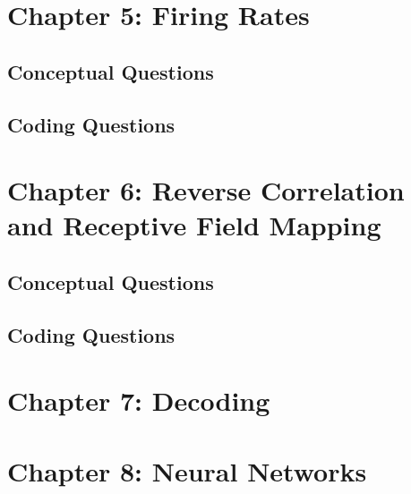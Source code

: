 \documentclass[
]{book}
\begin{document}
\hypertarget{chapter-5-firing-rates}{%
\section{Chapter 5: Firing Rates}\label{chapter-5-firing-rates}}

\hypertarget{conceptual-questions-2}{%
\subsection{Conceptual Questions}\label{conceptual-questions-2}}

\hypertarget{coding-questions-2}{%
\subsection{Coding Questions}\label{coding-questions-2}}

\hypertarget{chapter-6-reverse-correlation-and-receptive-field-mapping}{%
\section{Chapter 6: Reverse Correlation and Receptive Field Mapping}\label{chapter-6-reverse-correlation-and-receptive-field-mapping}}

\hypertarget{conceptual-questions-3}{%
\subsection{Conceptual Questions}\label{conceptual-questions-3}}

\hypertarget{coding-questions-3}{%
\subsection{Coding Questions}\label{coding-questions-3}}

\hypertarget{chapter-7-decoding}{%
\section{Chapter 7: Decoding}\label{chapter-7-decoding}}

\hypertarget{chapter-8-neural-networks}{%
\section{Chapter 8: Neural Networks}\label{chapter-8-neural-networks}}
\end{document}
